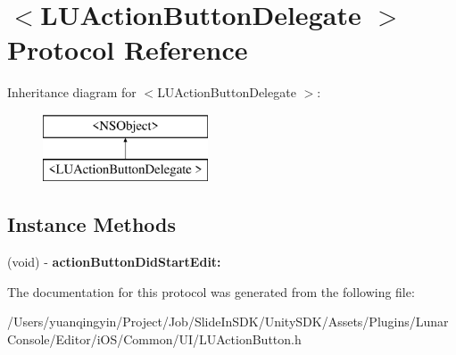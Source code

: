 \hypertarget{protocol_l_u_action_button_delegate_01-p}{}\section{$<$L\+U\+Action\+Button\+Delegate $>$ Protocol Reference}
\label{protocol_l_u_action_button_delegate_01-p}
Inheritance diagram for $<$L\+U\+Action\+Button\+Delegate $>$\+:\begin{figure}[H]
\begin{center}
\leavevmode
\includegraphics[height=2.000000cm]{protocol_l_u_action_button_delegate_01-p}
\end{center}
\end{figure}
\subsection*{Instance Methods}
\begin{DoxyCompactItemize}
\item 
\mbox{\label{protocol_l_u_action_button_delegate_01-p_a7a862f16cb3aace7b4b8d176012f560f}} 
(void) -\/ {\bfseries action\+Button\+Did\+Start\+Edit\+:}
\end{DoxyCompactItemize}


The documentation for this protocol was generated from the following file\+:\begin{DoxyCompactItemize}
\item 
/\+Users/yuanqingyin/\+Project/\+Job/\+Slide\+In\+S\+D\+K/\+Unity\+S\+D\+K/\+Assets/\+Plugins/\+Lunar\+Console/\+Editor/i\+O\+S/\+Common/\+U\+I/L\+U\+Action\+Button.\+h\end{DoxyCompactItemize}
